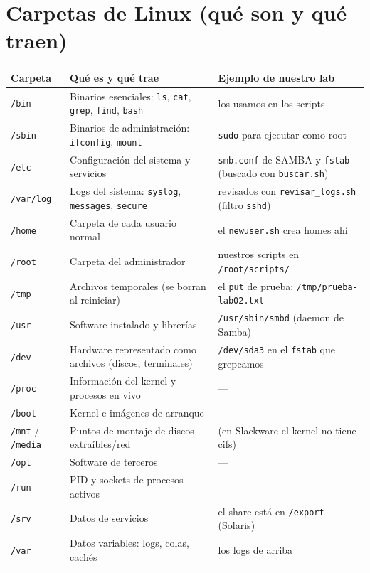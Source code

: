 \section{Carpetas de Linux (qué son y qué traen)}

\begin{center}
\begin{tabularx}{\textwidth}{lXl}
  \toprule
  \textbf{Carpeta} & \textbf{Qué es y qué trae} & \textbf{Ejemplo de nuestro lab} \\
  \midrule
  \texttt{/bin} & Binarios esenciales: \texttt{ls}, \texttt{cat}, \texttt{grep}, \texttt{find}, \texttt{bash} & los usamos en los scripts \\
  \texttt{/sbin} & Binarios de administración: \texttt{ifconfig}, \texttt{mount} & \texttt{sudo} para ejecutar como root \\
  \texttt{/etc} & Configuración del sistema y servicios & \texttt{smb.conf} de SAMBA y \texttt{fstab} (buscado con \texttt{buscar.sh}) \\
  \texttt{/var/log} & Logs del sistema: \texttt{syslog}, \texttt{messages}, \texttt{secure} & revisados con \texttt{revisar\_logs.sh} (filtro \texttt{sshd}) \\
  \texttt{/home} & Carpeta de cada usuario normal & el \texttt{newuser.sh} crea homes ahí \\
  \texttt{/root} & Carpeta del administrador & nuestros scripts en \texttt{/root/scripts/} \\
  \texttt{/tmp} & Archivos temporales (se borran al reiniciar) & el \texttt{put} de prueba: \texttt{/tmp/prueba-lab02.txt} \\
  \texttt{/usr} & Software instalado y librerías & \texttt{/usr/sbin/smbd} (daemon de Samba) \\
  \texttt{/dev} & Hardware representado como archivos (discos, terminales) & \texttt{/dev/sda3} en el \texttt{fstab} que grepeamos \\
  \texttt{/proc} & Información del kernel y procesos en vivo & --- \\
  \texttt{/boot} & Kernel e imágenes de arranque & --- \\
  \texttt{/mnt} / \texttt{/media} & Puntos de montaje de discos extraíbles/red & (en Slackware el kernel no tiene cifs) \\
  \texttt{/opt} & Software de terceros & --- \\
  \texttt{/run} & PID y sockets de procesos activos & --- \\
  \texttt{/srv} & Datos de servicios & el share está en \texttt{/export} (Solaris) \\
  \texttt{/var} & Datos variables: logs, colas, cachés & los logs de arriba \\
  \bottomrule
\end{tabularx}
\end{center}

